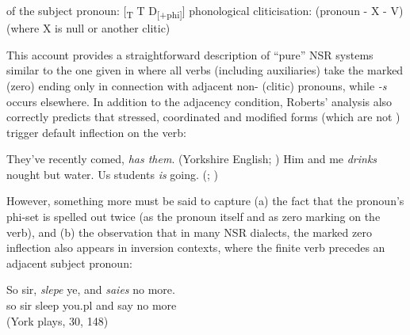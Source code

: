 \documentclass[output=paper]{langsci/langscibook}
\begin{document}
\ea\label{ex:10:26}
\ea {} of the subject pronoun: [\textsubscript{T} T D\textsubscript{[+phi]}]
\ex phonological cliticisation: (pronoun - X - V) (where X is null or another clitic)
\z
\z

This account provides a straightforward description of ``pure''
\gls{NSR} systems similar to the one given in
 where all verbs (including auxiliaries) take the
marked (zero) ending only in connection with adjacent non-\Tsg{} (clitic)
pronouns, while \emph{-s} occurs elsewhere. In addition
to the adjacency condition, Roberts' analysis also correctly predicts that
stressed, coordinated and modified forms (which are not ) trigger
default inflection on the verb:

\ea
\ea They've recently comed, \textit{has them}.
(Yorkshire English; \citealt[88]{Pietsch:2005b})
\ex Him and me \textit{drinks} nought but water.
\parencite[6]{Roberts:2010}
\ex Us students \textit{is} going.
(; \citealt[24]{Henry:1995})
\z
\z

However, something more must be said to capture (a) the fact that the pronoun's
phi-set is spelled out twice (as the pronoun itself and as zero marking on the
verb), and (b) the observation that in many \gls{NSR}
dialects, the marked zero inflection also appears in inversion contexts, where
the finite verb precedes an adjacent subject pronoun:

\ea \label{ex:10:28}
\gll So sir, \textit{slepe} ye, and \textit{saies} no more.\\
so sir sleep you.pl and say no more\\
\glt (York plays, 30, 148)
\z
\end{document}
